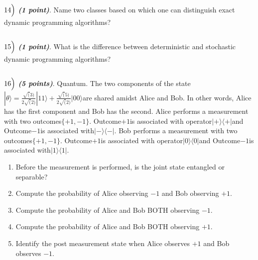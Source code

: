 \documentclass[11pt]{article}
\makeatletter
\newcommand{\boxspacing}{\kern\kvtcb@left@rule\kern\kvtcb@boxsep}
\newcommand{\prompt}[4]{
        {\ttfamily\llap{{\color{#2}[#3]:\hspace{3pt}#4}}\vspace{-\baselineskip}}
    }
\makeatother
\begin{document}
    \(14\Bigl)\) \textbf{\emph{(1 point)}}. Name two classes based on which
one can distinguish exact dynamic programming algorithms?

    \begin{tcolorbox}[breakable, size=fbox, boxrule=1pt, pad at break*=1mm,colback=cellbackground, colframe=cellborder]
\prompt{In}{incolor}{ }{\boxspacing}
\begin{Verbatim}[commandchars=\\\{\}]

\end{Verbatim}
\end{tcolorbox}

    \(15\Bigl)\) \textbf{\emph{(1 point)}}. What is the difference between
deterministic and stochastic dynamic programming algorithms?

    \begin{tcolorbox}[breakable, size=fbox, boxrule=1pt, pad at break*=1mm,colback=cellbackground, colframe=cellborder]
\prompt{In}{incolor}{ }{\boxspacing}
\begin{Verbatim}[commandchars=\\\{\}]

\end{Verbatim}
\end{tcolorbox}

    \(16\Bigl)\) \textbf{\emph{(5 points)}}. Quantum. The two components of
the
state\(|\theta⟩= \frac{\sqrt(3)}{2\sqrt(2)}|11⟩+ \frac{\sqrt(5)}{2\sqrt(2)}|00⟩\)are
shared amidst Alice and Bob. In other words, Alice has the first
component and Bob has the second. Alice performs a measurement with two
outcomes\(\{{+1,−1}\}\). Outcome\(+1\)is associated with
operator\(|+⟩⟨+|\)and Outcome\(−1\)is associated with\(|−⟩⟨−|\). Bob
performs a measurement with two outcomes\(\{{+1,−1}\}\). Outcome\(+1\)is
associated with operator\(|0⟩⟨0|\)and Outcome\(−1\)is associated
with\(|1⟩⟨1|\).

\begin{enumerate}
\def\labelenumi{\alph{enumi})}
\item
  Before the measurement is performed, is the joint state entangled or
  separable?
\item
  Compute the probability of Alice observing \(-1\) and Bob observing
  \(+1\).
\item
  Compute the probability of Alice and Bob BOTH observing \(−1\).
\item
  Compute the probability of Alice and Bob BOTH observing \(+1\).
\item
  Identify the post measurement state when Alice observes \(+1\) and Bob
  observes \(−1\).
\end{enumerate}

    \begin{tcolorbox}[breakable, size=fbox, boxrule=1pt, pad at break*=1mm,colback=cellbackground, colframe=cellborder]
\prompt{In}{incolor}{ }{\boxspacing}
\begin{Verbatim}[commandchars=\\\{\}]

\end{Verbatim}
\end{tcolorbox}


    
    
    
\end{document}
